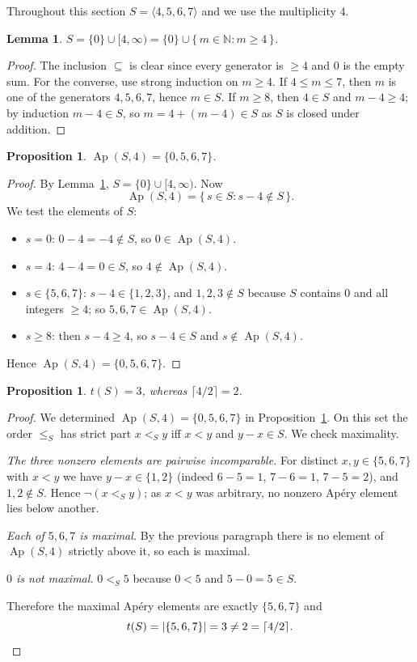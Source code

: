 \documentclass[11pt]{article}
\newtheorem{lemma}[theorem]{Lemma}
\newtheorem{proposition}[theorem]{Proposition}
\theoremstyle{definition}
\theoremstyle{remark}
\newcommand{\N}{\mathbb{N}}
\newcommand{\Ap}{\operatorname{Ap}}
\newcommand{\gen}[1]{\langle #1 \rangle}
\begin{document}
Throughout this section $S = \gen{4,5,6,7}$ and we use the multiplicity $4$.

\begin{lemma}\label{lem:S}
$S = \{0\} \cup [4, \infty) = \{0\} \cup \{\, m \in \N : m \ge 4 \,\}$.
\end{lemma}

\begin{proof}
The inclusion $\subseteq$ is clear since every generator is $\ge 4$ and $0$
is the empty sum. For the converse, use strong induction on $m \ge 4$. If
$4 \le m \le 7$, then $m$ is one of the generators $4,5,6,7$, hence $m \in S$.
If $m \ge 8$, then $4 \in S$ and $m - 4 \ge 4$; by induction $m - 4 \in S$, so
$m = 4 + (m-4) \in S$ as $S$ is closed under addition.
\end{proof}

\begin{proposition}\label{prop:apery4}
$\Ap(S,4) = \{0, 5, 6, 7\}$.
\end{proposition}

\begin{proof}
By Lemma~\ref{lem:S}, $S = \{0\} \cup [4,\infty)$. Now
\[
\Ap(S,4) = \{\, s \in S : s - 4 \notin S \,\}.
\]
We test the elements of $S$:
\begin{itemize}
\item $s = 0$: $0 - 4 = -4 \notin S$, so $0 \in \Ap(S,4)$.
\item $s = 4$: $4 - 4 = 0 \in S$, so $4 \notin \Ap(S,4)$.
\item $s \in \{5,6,7\}$: $s - 4 \in \{1,2,3\}$, and $1,2,3 \notin S$ because
  $S$ contains $0$ and all integers $\ge 4$; so $5,6,7 \in \Ap(S,4)$.
\item $s \ge 8$: then $s - 4 \ge 4$, so $s - 4 \in S$ and
  $s \notin \Ap(S,4)$.
\end{itemize}
Hence $\Ap(S,4) = \{0,5,6,7\}$.
\end{proof}

\begin{proposition}\label{prop:t4}
$t(S) = 3$, whereas $\lceil 4/2 \rceil = 2$.
\end{proposition}

\begin{proof}
We determined $\Ap(S,4) = \{0,5,6,7\}$ in Proposition~\ref{prop:apery4}. On
this set the order $\le_S$ has strict part $x <_S y$ iff $x < y$ and
$y - x \in S$. We check maximality.

\emph{The three nonzero elements are pairwise incomparable.} For distinct
$x, y \in \{5,6,7\}$ with $x < y$ we have $y - x \in \{1,2\}$ (indeed
$6-5 = 1$, $7-6 = 1$, $7-5 = 2$), and $1, 2 \notin S$. Hence
$\neg(x <_S y)$; as $x < y$ was arbitrary, no nonzero Apéry element lies below
another.

\emph{Each of $5, 6, 7$ is maximal.} By the previous paragraph there is no
element of $\Ap(S,4)$ strictly above it, so each is maximal.

\emph{$0$ is not maximal.} $0 <_S 5$ because $0 < 5$ and $5 - 0 = 5 \in S$.

Therefore the maximal Apéry elements are exactly $\{5,6,7\}$ and
\[
t(S) = |\{5,6,7\}| = 3 \neq 2 = \lceil 4/2 \rceil . \qedhere
\]
\end{proof}
\end{document}
